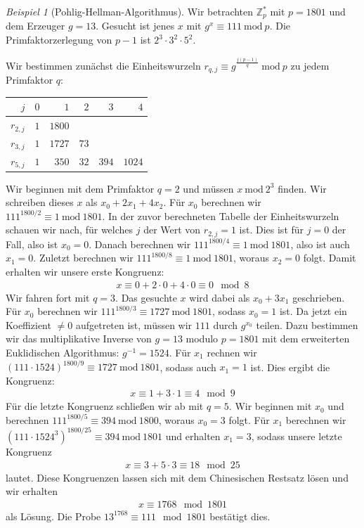 \documentclass[
  a4paper,
  11pt,
]{scrartcl}
\theoremstyle{plain}
\theoremstyle{definition}
\theoremstyle{remark}
\newtheorem{beispiel}{Beispiel}
\newcommand{\Z}{\mathbb{Z}}
\newcommand{\Mod}[1]{\ \mathrm{mod}\ #1}
\begin{document}
\begin{beispiel}[Pohlig-Hellman-Algorithmus]
  Wir betrachten $\Z_p^*$ mit $p = 1801$ und dem Erzeuger $g = 13$. Gesucht ist
  jenes $x$ mit $g^x \equiv 111 \Mod{p}$. Die Primfaktorzerlegung von $p-1$ ist
  $2^3 \cdot 3^2 \cdot 5^2$.

  Wir bestimmen zunächst die Einheitswurzeln
  $r_{q, j} \equiv g^{\frac{j(p-1)}{q}} \Mod{p}$ zu jedem Primfaktor $q$:
  \begin{center}
    \begin{tabular}{rrrrrr}
      \toprule
      $j$ & $0$ & $1$ & $2$ & $3$ & $4$\\
      \midrule
      $r_{2,j}$ & $1$ & $1800$\\
      \midrule
      $r_{3,j}$ & $1$ & $1727$ & $73$\\
      \midrule
      $r_{5,j}$ & $1$ & $350$ & $32$ & $394$ & $1024$\\
      \bottomrule
    \end{tabular}
  \end{center}
  Wir beginnen mit dem Primfaktor $q = 2$ und müssen $x \Mod{2^3}$ finden. Wir
  schreiben dieses $x$ als $x_0 + 2 x_1 + 4 x_2$. Für $x_0$ berechnen wir
  $111^{1800/2} \equiv 1 \Mod{1801}$. In der zuvor berechneten Tabelle der
  Einheitswurzeln schauen wir nach, für welches $j$ der Wert von $r_{2, j} = 1$
  ist. Dies ist für $j=0$ der Fall, also ist $x_0 = 0$. Danach berechnen wir
  $111^{1800/4} \equiv 1 \Mod{1801}$, also ist auch $x_1 = 0$. Zuletzt
  berechnen wir $111^{1800/8} \equiv 1 \Mod{1801}$, woraus $x_2 = 0$ folgt.
  Damit erhalten wir unsere erste Kongruenz:
  \begin{align*}
    x \equiv 0 + 2 \cdot 0 + 4 \cdot 0 \equiv 0 \mod 8
  \end{align*}
  Wir fahren fort mit $q = 3$. Das gesuchte $x$ wird dabei als $x_0 + 3 x_1$
  geschrieben. Für $x_0$ berechnen wir $111^{1800/3} \equiv 1727 \Mod{1801}$,
  sodass $x_0 = 1$ ist. Da jetzt ein Koeffizient $\neq 0$ aufgetreten ist,
  müssen wir $111$ durch $g^{x_0}$ teilen. Dazu bestimmen wir das multiplikative
  Inverse von $g = 13$ modulo $p = 1801$ mit dem erweiterten Euklidischen
  Algorithmus: $g^{-1} = 1524$. Für $x_1$ rechnen wir
  ${(111 \cdot 1524)}^{1800/9} \equiv 1727 \Mod{1801}$, sodass auch $x_1 = 1$
  ist. Dies ergibt die Kongruenz:
  \begin{align*}
    x \equiv 1 + 3 \cdot 1 \equiv 4 \mod 9
  \end{align*}
  Für die letzte Kongruenz schließen wir ab mit $q = 5$. Wir beginnen mit $x_0$
  und berechnen $111^{1800/5} \equiv 394 \Mod{1800}$, woraus $x_0 = 3$ folgt.
  Für $x_1$ berechnen wir
  ${\left(111 \cdot 1524^3\right)}^{1800/25} \equiv 394 \Mod{1801}$
  und erhalten $x_1 = 3$, sodass unsere letzte Kongruenz
  \begin{align*}
    x \equiv 3 + 5 \cdot 3 \equiv 18 \mod 25
  \end{align*}
  lautet. Diese Kongruenzen lassen sich mit dem Chinesischen Restsatz lösen und
  wir erhalten
  \begin{align*}
    x \equiv 1768 \mod 1801
  \end{align*}
  als Lösung. Die Probe $13^{1768} \equiv 111 \mod 1801$ bestätigt dies.
\end{beispiel}
\end{document}
